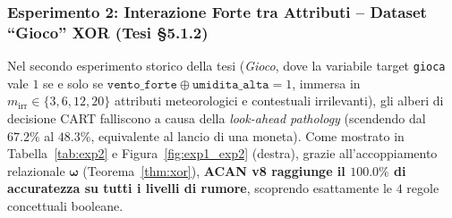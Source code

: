 \documentclass[10pt,a4paper]{article}
\begin{document}
\begin{table}[!htbp]
\centering
\caption{Esperimento 1 (Tesi \S 5.1.1): Accuratezza di predizione (\%) al crescere degli attributi irrilevanti $m_{\text{irr}}$.}
\label{tab:exp1}
\footnotesize
{}
\end{table}

\subsubsection{Esperimento 2: Interazione Forte tra Attributi -- Dataset ``Gioco'' XOR (Tesi \S 5.1.2)}
Nel secondo esperimento storico della tesi (\textit{Gioco}, dove la variabile target \texttt{gioca} vale $1$ se e solo se $\texttt{vento\_forte} \oplus \texttt{umidita\_alta} = 1$, immersa in $m_{\text{irr}} \in \{3, 6, 12, 20\}$ attributi meteorologici e contestuali irrilevanti), gli alberi di decisione CART falliscono a causa della \textit{look-ahead pathology} (scendendo dal $67.2\%$ al $48.3\%$, equivalente al lancio di una moneta). Come mostrato in Tabella~\ref{tab:exp2} e Figura~\ref{fig:exp1_exp2} (destra), grazie all'accoppiamento relazionale $\boldsymbol{\omega}$ (Teorema~\ref{thm:xor}), \textbf{ACAN v8 raggiunge il $\mathbf{100.0\%}$ di accuratezza su tutti i livelli di rumore}, scoprendo esattamente le $4$ regole concettuali booleane.
\end{document}
